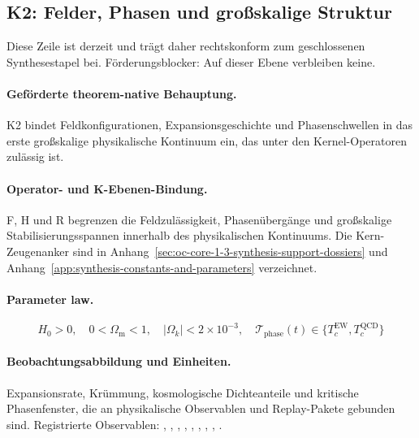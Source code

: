 \subsection{K2: Felder, Phasen und großskalige Struktur}
\label{sec:oc-core-1-3-synthesis-k2}
Diese Zeile ist derzeit  und trägt daher rechtskonform zum geschlossenen Synthesestapel bei.
Förderungsblocker: Auf dieser Ebene verbleiben keine.

\paragraph{Geförderte theorem-native Behauptung.}
K2 bindet Feldkonfigurationen, Expansionsgeschichte und Phasenschwellen in das erste großskalige physikalische Kontinuum ein, das unter den Kernel-Operatoren zulässig ist.

\paragraph{Operator- und K-Ebenen-Bindung.}
F, H und R begrenzen die Feldzulässigkeit, Phasenübergänge und großskalige Stabilisierungsspannen innerhalb des physikalischen Kontinuums.
Die Kern-Zeugenanker sind in Anhang~\ref{sec:oc-core-1-3-synthesis-support-dossiers} und Anhang~\ref{app:synthesis-constants-and-parameters} verzeichnet.

\paragraph{Parameter law.}
\[
H_0 > 0,\quad 0 < \Omega_{\mathrm{m}} < 1,\quad |\Omega_k| < 2 \times 10^{-3},\quad \mathcal{T}_{\mathrm{phase}}(t) \in \{T_c^{\mathrm{EW}}, T_c^{\mathrm{QCD}}\}
\]

\paragraph{Beobachtungsabbildung und Einheiten.}
Expansionsrate, Krümmung, kosmologische Dichteanteile und kritische Phasenfenster, die an physikalische Observablen und Replay-Pakete gebunden sind.
Registrierte Observablen: , \allowbreak {}, \allowbreak {}, \allowbreak {}, \allowbreak {}, \allowbreak {}, \allowbreak {}, \allowbreak {}, \allowbreak {}.

